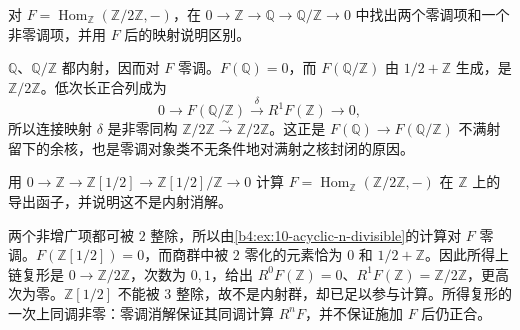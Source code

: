 \begin{exercise}\label{b4:ex:10-acyclic-kernel-warning}
	对 \(F=\operatorname{Hom}_{\mathbb Z}(\mathbb Z/2\mathbb Z,-)\)，在 \(0\to\mathbb Z\to\mathbb Q\to\mathbb Q/\mathbb Z\to0\) 中找出两个零调项和一个非零调项，并用 \(F\) 后的映射说明区别。
\end{exercise}
\begin{solution}
	\(\mathbb Q\)、\(\mathbb Q/\mathbb Z\) 都内射，因而对 \(F\) 零调。\(F(\mathbb Q)=0\)，而 \(F(\mathbb Q/\mathbb Z)\) 由 \(1/2+\mathbb Z\) 生成，是 \(\mathbb Z/2\mathbb Z\)。低次长正合列成为
	\[
		0\longrightarrow F(\mathbb Q/\mathbb Z) \xrightarrow{\delta}R^1F(\mathbb Z)\longrightarrow0,
	\]
	所以连接映射 \(\delta\) 是非零同构 \(\mathbb Z/2\mathbb Z\xrightarrow{\sim}\mathbb Z/2\mathbb Z\)。这正是 \(F(\mathbb Q)\to F(\mathbb Q/\mathbb Z)\) 不满射留下的余核，也是零调对象类不无条件地对满射之核封闭的原因。
\end{solution}

\begin{exercise}\label{b4:ex:10-small-acyclic-resolution}
	用 \(0\to\mathbb Z\to\mathbb Z[1/2]\to\mathbb Z[1/2]/\mathbb Z\to0\) 计算 \(F=\operatorname{Hom}_{\mathbb Z}(\mathbb Z/2\mathbb Z,-)\) 在 \(\mathbb Z\) 上的导出函子，并说明这不是内射消解。
\end{exercise}
\begin{solution}
	两个非增广项都可被 \(2\) 整除，所以由\cref{b4:ex:10-acyclic-n-divisible}的计算对 \(F\) 零调。\(F(\mathbb Z[1/2])=0\)，而商群中被 \(2\) 零化的元素恰为 \(0\) 和 \(1/2+\mathbb Z\)。因此所得上链复形是 \(0\to\mathbb Z/2\mathbb Z\)，次数为 \(0,1\)，给出 \(R^0F(\mathbb Z)=0\)、\(R^1F(\mathbb Z)=\mathbb Z/2\mathbb Z\)，更高次为零。\(\mathbb Z[1/2]\) 不能被 \(3\) 整除，故不是内射群，却已足以参与计算。所得复形的一次上同调非零：零调消解保证其同调计算 \(R^nF\)，并不保证施加 \(F\) 后仍正合。
\end{solution}

